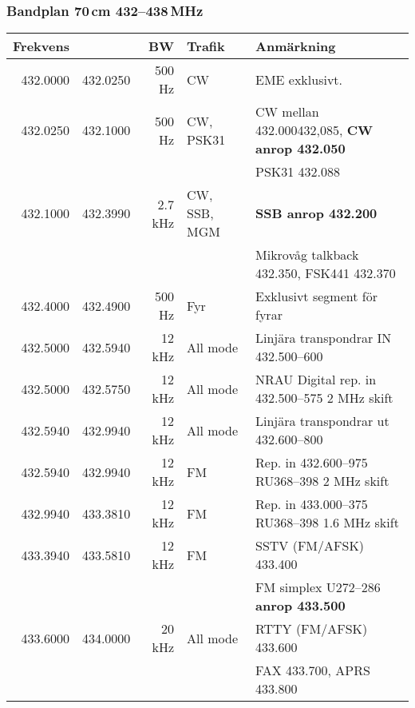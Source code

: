 \subsubsection{Bandplan 70\,cm 432--438\,MHz}
\begin{tabular}{rrrll}
	\textbf{Frekvens} &          & \textbf{BW} & \textbf{Trafik} & \textbf{Anmärkning}                               \\ \hline
	
432.0000 & 432.0250 & 500 Hz  & CW           & EME exklusivt.                                    \\ \hline
432.0250 & 432.1000 & 500 Hz  & CW, PSK31    & CW mellan \num{432,000}{432,085}, \textbf{CW anrop 432.050} \\
         &          &         &              & PSK31 432.088                                     \\ \hline
432.1000 & 432.3990 & 2.7 kHz & CW, SSB, MGM & \textbf{SSB anrop 432.200}                        \\
&          &         &              & Mikrovåg talkback 432.350, FSK441 432.370         \\ \hline
432.4000 & 432.4900 & 500 Hz  & Fyr          & Exklusivt segment för fyrar                       \\ \hline
432.5000 & 432.5940 & 12 kHz  & All mode     & Linjära transpondrar IN 432.500--600              \\ \hline
432.5000 & 432.5750 & 12 kHz  & All mode     & NRAU Digital rep. in 432.500--575 2 MHz skift     \\ \hline
432.5940 & 432.9940 & 12 kHz  & All mode     & Linjära transpondrar ut 432.600--800              \\ \hline
432.5940 & 432.9940 & 12 kHz  & FM           & Rep. in 432.600--975 RU368--398 2 MHz skift       \\ \hline
432.9940 & 433.3810 & 12 kHz  & FM           & Rep. in 433.000--375 RU368--398 1.6 MHz skift     \\ \hline
433.3940 & 433.5810 & 12 kHz  & FM           & SSTV (FM/AFSK) 433.400                            \\
&          &         &              & FM simplex U272--286 \textbf{anrop 433.500}       \\ \hline
433.6000 & 434.0000 & 20 kHz  & All mode     & RTTY (FM/AFSK) 433.600                            \\
&          &         &              & FAX 433.700, APRS 433.800                         \\ \hline

\end{tabular}
